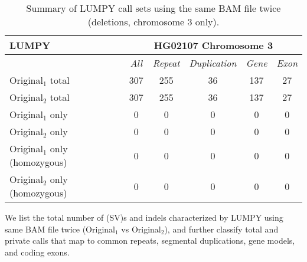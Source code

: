 \begin{table}[htb]
\caption{ Summary of LUMPY call sets using the same BAM file twice (deletions, chromosome 3 only). }
\begin{center}
\begin{tabular}{|l|c||c|c|c|c|}
\hline
{\bf LUMPY} & \multicolumn{5}{|c|}{\bf HG02107 Chromosome 3} \\
\hline
\cline{2-6}
{\bf} & {\it All} & {\it Repeat} & {\it Duplication} & {\it Gene} & {\it Exon} \\
\hline
Original$_1$ total & 307 & 255 & 36 & 137 & 27 \\
\hline
Original$_2$ total & 307 & 255 & 36 & 137 & 27 \\
\hline
Original$_1$ only & 0 & 0 & 0 & 0 & 0\\ 
\hline
Original$_2$ only & 0 & 0 & 0 & 0 & 0\\
\hline
Original$_1$ only (homozygous) & 0 & 0 & 0 & 0 & 0\\ 
\hline
Original$_2$ only (homozygous) & 0 & 0 & 0 & 0 & 0\\  
\hline
\end{tabular}
\end{center}
{\footnotesize We list the total number of (SV)s and indels characterized by LUMPY using same BAM file twice (Original$_1$ vs Original$_2$), 
and further classify total and private calls that map to common repeats, segmental duplications, gene models, and coding exons.}
\label{supptab:orig-vs-orig2-lumpy}
\end{table}

